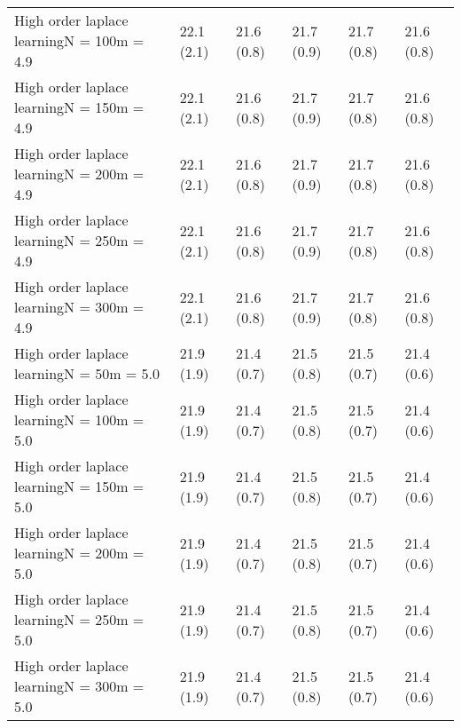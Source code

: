\documentclass{article}
\begin{document}
\begin{table*}[t!]
\begin{center}
\begin{small}
\begin{sc}
\begin{tabular}{llllll}
High order laplace learningN = 100m = 4.9&22.1 (2.1)      &21.6 (0.8)      &21.7 (0.9)      &21.7 (0.8)      &21.6 (0.8)      \\
High order laplace learningN = 150m = 4.9&22.1 (2.1)      &21.6 (0.8)      &21.7 (0.9)      &21.7 (0.8)      &21.6 (0.8)      \\
High order laplace learningN = 200m = 4.9&22.1 (2.1)      &21.6 (0.8)      &21.7 (0.9)      &21.7 (0.8)      &21.6 (0.8)      \\
High order laplace learningN = 250m = 4.9&22.1 (2.1)      &21.6 (0.8)      &21.7 (0.9)      &21.7 (0.8)      &21.6 (0.8)      \\
High order laplace learningN = 300m = 4.9&22.1 (2.1)      &21.6 (0.8)      &21.7 (0.9)      &21.7 (0.8)      &21.6 (0.8)      \\
High order laplace learningN = 50m = 5.0&21.9 (1.9)      &21.4 (0.7)      &21.5 (0.8)      &21.5 (0.7)      &21.4 (0.6)      \\
High order laplace learningN = 100m = 5.0&21.9 (1.9)      &21.4 (0.7)      &21.5 (0.8)      &21.5 (0.7)      &21.4 (0.6)      \\
High order laplace learningN = 150m = 5.0&21.9 (1.9)      &21.4 (0.7)      &21.5 (0.8)      &21.5 (0.7)      &21.4 (0.6)      \\
High order laplace learningN = 200m = 5.0&21.9 (1.9)      &21.4 (0.7)      &21.5 (0.8)      &21.5 (0.7)      &21.4 (0.6)      \\
High order laplace learningN = 250m = 5.0&21.9 (1.9)      &21.4 (0.7)      &21.5 (0.8)      &21.5 (0.7)      &21.4 (0.6)      \\
High order laplace learningN = 300m = 5.0&21.9 (1.9)      &21.4 (0.7)      &21.5 (0.8)      &21.5 (0.7)      &21.4 (0.6)      \\
\bottomrule
\end{tabular}
\end{sc}
\end{small}
\end{center}
\vskip -0.1in
\end{table*}
\end{document}
